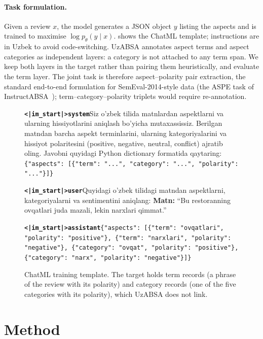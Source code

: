 \documentclass[runningheads]{llncs}
\begin{document}
\paragraph{Task formulation.} Given a review $x$, the model generates a JSON object $y$ listing the aspects and is trained to maximise $\log p_\theta(y \mid x)$.  shows the ChatML template; instructions are in Uzbek to avoid code-switching. UzABSA annotates aspect terms and aspect categories as independent layers: a category is not attached to any term span. We keep both layers in the target rather than pairing them heuristically, and evaluate the term layer. The joint task is therefore aspect--polarity pair extraction, the standard end-to-end formulation for SemEval-2014-style data (the ASPE task of InstructABSA~\cite{scaria-etal-2024-instructabsa}); term--category--polarity triplets would require re-annotation.

\begin{figure}[t]
\begin{tcolorbox}[colback=gray!3, colframe=gray!45, boxrule=0.4pt, arc=1pt,
  left=4pt, right=4pt, top=3pt, bottom=3pt, fontupper=\scriptsize\raggedright]
\textbf{\texttt{<|im\_start|>system}}\enspace Siz o'zbek tilida matnlardan aspektlarni va ularning hissiyotlarini aniqlash bo'yicha mutaxassissiz. Berilgan matndan barcha aspekt terminlarini, ularning kategoriyalarini va hissiyot polaritesini (positive, negative, neutral, conflict) ajratib oling. Javobni quyidagi Python dictionary formatida qaytaring: \texttt{\{"aspects": [\{"term": "...", "category": "...", "polarity": "..."\}]\}}

\smallskip
\textbf{\texttt{<|im\_start|>user}}\enspace Quyidagi o'zbek tilidagi matndan aspektlarni, kategoriyalarni va sentimentini aniqlang: \textbf{Matn:} ``Bu restoranning ovqatlari juda mazali, lekin narxlari qimmat.''

\smallskip
\textbf{\texttt{<|im\_start|>assistant}}\enspace \texttt{\{"aspects": [\{"term": "ovqatlari", "polarity": "positive"\}, \{"term": "narxlari", "polarity": "negative"\}, \{"category": "ovqat", "polarity": "positive"\}, \{"category": "narx", "polarity": "negative"\}]\}}
\end{tcolorbox}
\caption{ChatML training template. The target holds term records (a phrase of the review with its polarity) and category records (one of the five categories with its polarity), which UzABSA does not link.}
\label{fig:template}
\end{figure}

\section{Method}
\label{sec:method}
\end{document}
